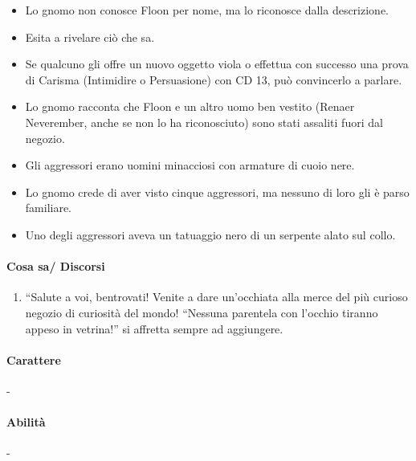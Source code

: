 \documentclass{article}
\begin{document}
                        \begin{itemize}
                            \item Lo gnomo non conosce Floon per nome, ma lo riconosce dalla descrizione.
                            \item Esita a rivelare ciò che sa.
                            \item Se qualcuno gli offre un nuovo oggetto viola o effettua con successo una prova di Carisma (Intimidire o Persuasione) con CD 13, può convincerlo a parlare.
                            \item Lo gnomo racconta che Floon e un altro uomo ben vestito (Renaer Neverember, anche se non lo ha riconosciuto) sono stati assaliti fuori dal negozio.
                            \item Gli aggressori erano uomini minacciosi con armature di cuoio nere.
                            \item Lo gnomo crede di aver visto cinque aggressori, ma nessuno di loro gli è parso familiare.
                            \item Uno degli aggressori aveva un tatuaggio nero di un serpente alato sul collo.
                        \end{itemize}
   
\paragraph{Cosa sa/ Discorsi}
    \begin{enumerate}
        \item   “Salute a voi, bentrovati! Venite a dare un'occhiata alla merce del più curioso negozio di curiosità del mondo!  “Nessuna parentela con l'occhio tiranno appeso in vetrina!” si affretta sempre ad aggiungere.
    \end{enumerate}

\paragraph{Carattere} -
\paragraph{Abilità } -
\end{document}
